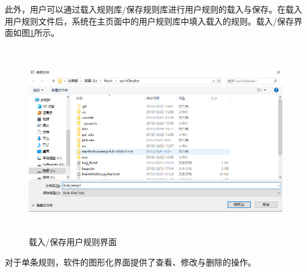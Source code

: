 		此外，用户可以通过载入规则库/保存规则库进行用户规则的载入与保存。在载入用户规则文件后，系统在主页面中的用户规则库中填入载入的规则。载入/保存界面如图\ref{fig-gui-4}所示。
		\begin{figure}[htbp]
			\centering
			\includegraphics[width=5.77222in,height=3.25000in]{src/gui-4.png}
			\caption{载入/保存用户规则界面}
			\label{fig-gui-4}
		\end{figure}
		对于单条规则，软件的图形化界面提供了查看、修改与删除的操作。
